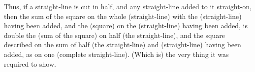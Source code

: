 \begin{Parallel}{}{}
{Thus, if a straight-line is cut in half, and any straight-line added to it straight-on,
then the sum of the square on the whole (straight-line) with the (straight-line) having
been added, and the (square) on the (straight-line) having been added, 
is double the (sum of the square) on half (the straight-line), and
the square described on the sum of half (the straight-line) and (straight-line)
having been added, as on one (complete straight-line). (Which is) the
very thing it was required to show.}
\end{Parallel}


\vspace{7pt}{\footnotesize \noindent$^\dag$ This proposition is a geometric version
of the algebraic identity: $(2\,a+b)^2+b^2= 2\,[a^2+(a+b)^2]$.}

